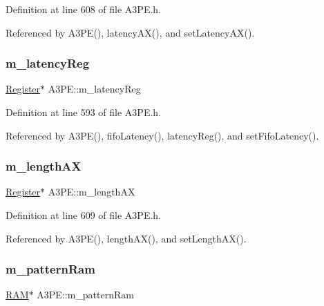 Definition at line 608 of file A3\+P\+E.\+h.



Referenced by A3\+P\+E(), latency\+A\+X(), and set\+Latency\+A\+X().

\mbox{\label{classA3PE_a96a167e73e264da5a18d9ddb5ebb5f23}} 
\subsubsection{\texorpdfstring{m\+\_\+latency\+Reg}{m\_latencyReg}}
{\footnotesize\ttfamily \hyperlink{classRegister}{Register}$\ast$ A3\+P\+E\+::m\+\_\+latency\+Reg\hspace{0.3cm}{\ttfamily [private]}}



Definition at line 593 of file A3\+P\+E.\+h.



Referenced by A3\+P\+E(), fifo\+Latency(), latency\+Reg(), and set\+Fifo\+Latency().

\mbox{\label{classA3PE_a87c93a38343873f2d52741deca4750ce}} 
\subsubsection{\texorpdfstring{m\+\_\+length\+AX}{m\_lengthAX}}
{\footnotesize\ttfamily \hyperlink{classRegister}{Register}$\ast$ A3\+P\+E\+::m\+\_\+length\+AX\hspace{0.3cm}{\ttfamily [private]}}



Definition at line 609 of file A3\+P\+E.\+h.



Referenced by A3\+P\+E(), length\+A\+X(), and set\+Length\+A\+X().

\mbox{\label{classA3PE_a84d5deabbbf2d513144dd6a00390182e}} 
\subsubsection{\texorpdfstring{m\+\_\+pattern\+Ram}{m\_patternRam}}
{\footnotesize\ttfamily \hyperlink{classRAM}{R\+AM}$\ast$ A3\+P\+E\+::m\+\_\+pattern\+Ram\hspace{0.3cm}{\ttfamily [private]}}



